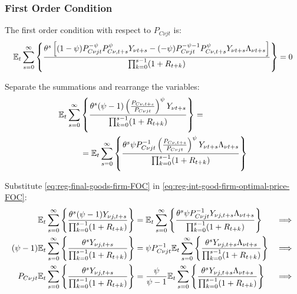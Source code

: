 \documentclass[
thesis.tex
]{subfiles}
\begin{document}

\subsubsection*{First Order Condition}

The first order condition with respect to $P_{C\nu jt}$ is:
\begin{align}
	& \quad {\mathbb{E}_{t}} \sum_{s=0}^{\infty} \left\{ \frac{\theta^s \left[ (1-\psi) P_{C\nu jt}^{-\psi} P_{C\nu, t+s}^{\psi} Y_{\nu t+s} - (-\psi) P_{C\nu jt}^{-\psi-1} P_{C\nu, t+s}^{\psi} Y_{\nu t+s} \Lambda_{\nu t+s} \right] }{\prod_{k=0}^{s-1}(1+R_{t+k})} \right\} = 0 \nonumber
\end{align}


Separate the summations and rearrange the variables:
\begin{align}
	\begin{split}
		{\mathbb{E}_{t}} \sum_{s=0}^{\infty} &\left\{ \frac{\theta^s (\psi-1) \left( \frac{P_{C\nu, t+s}} {P_{C\nu jt}} \right)^{\psi} Y_{\nu t+s}} {\prod_{k=0}^{s-1} (1+R_{t+k})} \right\} = \\
		&= {\mathbb{E}_{t}} \sum_{s=0}^{\infty} \left\{ \frac{\theta^s \psi P_{C\nu jt}^{-1} \left( \frac{P_{C\nu, t+s}} {P_{C\nu jt}} \right)^{\psi} Y_{\nu t+s} \Lambda_{\nu t+s} }{\prod_{k=0}^{s-1}(1+R_{t+k})} \right\} \label{eq:reg-int-good-firm-optimal-price-FOC}
	\end{split}
\end{align}


Substitute \ref{eq:reg-final-goods-firm-FOC} in \ref{eq:reg-int-good-firm-optimal-price-FOC}:
\begin{alignat}{2}
	{\mathbb{E}_{t}} \sum_{s=0}^{\infty} \Bigg\{ \frac{\theta^s (\psi-1) Y_{\nu j,t+s}}{\prod_{k=0}^{s-1}(1+R_{t+k})} \Bigg\} &= {\mathbb{E}_{t}} \sum_{s=0}^{\infty} \Bigg\{ \frac{\theta^s \psi P_{C\nu jt}^{-1} Y_{\nu j,t+s} \Lambda_{\nu t+s}}{\prod_{k=0}^{s-1}(1+R_{t+k})}  \Bigg\} &\implies \nonumber \\
	(\psi-1) {\mathbb{E}_{t}} \sum_{s=0}^{\infty} \Bigg\{ \frac{\theta^s Y_{\nu j,t+s}}{\prod_{k=0}^{s-1}(1+R_{t+k})} \Bigg\} &= \psi P_{C\nu jt}^{-1} {\mathbb{E}_{t}} \sum_{s=0}^{\infty} \Bigg\{ \frac{\theta^s Y_{\nu j,t+s} \Lambda_{\nu t+s}}{\prod_{k=0}^{s-1}(1+R_{t+k})}  \Bigg\} &\implies \nonumber \\
	P_{C\nu jt} {\mathbb{E}_{t}} \sum_{s=0}^{\infty} \Bigg\{ \frac{\theta^s Y_{\nu j,t+s}}{\prod_{k=0}^{s-1}(1+R_{t+k})} \Bigg\} &= \frac{\psi}{\psi-1} {\mathbb{E}_{t}} \sum_{s=0}^{\infty} \Bigg\{ \frac{\theta^s Y_{\nu j,t+s} \Lambda_{\nu t+s}}{\prod_{k=0}^{s-1}(1+R_{t+k})}  \Bigg\} &\implies \nonumber
\end{alignat}
\end{document}
